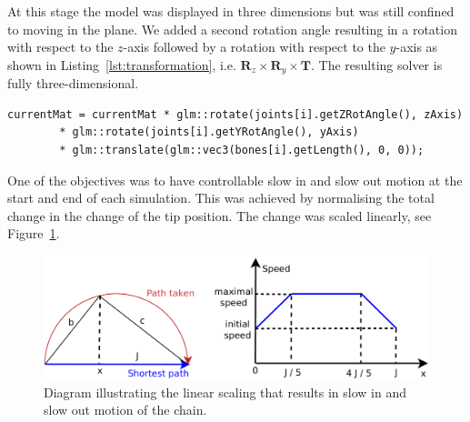 \documentclass[paper=a4, fontsize=11pt]{scrartcl} %
\numberwithin{equation}{section} %
\numberwithin{figure}{section} %
\numberwithin{table}{section} %
\begin{document}
At this stage the model was displayed in three dimensions but was still confined to moving in the plane. We added a second rotation angle resulting in a rotation with respect to the \(z\)-axis followed by a rotation with respect to the \(y\)-axis as shown in Listing~\ref{lst:transformation}, i.e. \( \mathbf{R}_z \times \mathbf{R}_y \times \mathbf{T}\). The resulting solver is fully three-dimensional. \\


\begin{lstlisting}[float,caption=Update total transformation with current joint rotation and translation., label={lst:transformation}]
currentMat = currentMat * glm::rotate(joints[i].getZRotAngle(), zAxis)
		* glm::rotate(joints[i].getYRotAngle(), yAxis)
		* glm::translate(glm::vec3(bones[i].getLength(), 0, 0));
\end{lstlisting}

One of the objectives was to have controllable slow in and slow out motion at the start and end of each simulation. This was achieved by normalising the total change in the change of the tip position. The change was scaled linearly, see Figure~\ref{fig:scaling}. \\
\begin{figure}[h]
\centering
\includegraphics[scale=0.5]{SpeedDiagram}
\caption{Diagram illustrating the linear scaling that results in slow in and slow out motion of the chain.}
\label{fig:scaling}
\end{figure}

  
\end{document}
